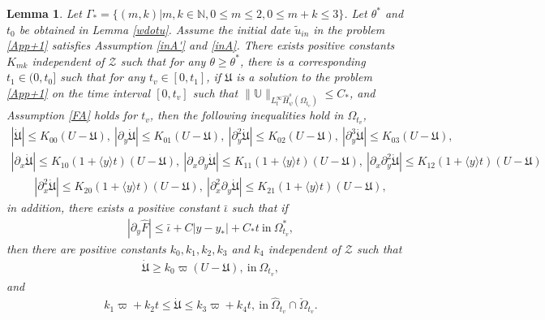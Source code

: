 \documentclass[10pt,a4paper]{amsart}
\newtheorem{lemma}{Lemma}
\newcommand\y{{{\langle y \rangle}}}
\begin{document}
\begin{lemma}\label{sdotu}
Let $\Gamma_{*}=\{(m,k)|m,k\in\mathbb{N}, 0\leq m\leq 2, 0\leq m+k\leq3\}$.
Let $\theta^{*}$ and $t_{0}$ be obtained in Lemma \ref{wdotu}.
Assume the initial date $\tilde{u}_{in}$ in the problem \eqref{App+1} satisfies Assumption \ref{inA'} and \ref{inA}.
There exists positive constants $K_{mk}$ independent of $\mathcal{Z}$ such that for any $\theta\geq\theta^{*}$, there is a corresponding $t_{1}\in(0,t_{0}]$ such that for any $t_{v}\in[0,t_{1}]$, if $\mathfrak{U}$ is a solution to the problem \eqref{App+1} on the time interval $[0,t_{v}]$ such that
$\|\mathbb{U}\|_{L_{t}^{\infty}\hat{H}_{\psi}^{s}(\Omega_{t_{v}})}\leq C_{*}$,
and Assumption \ref{FA} holds for $t_{v}$, then the following inequalities hold in $\Omega_{t_{v}}$,
\begin{align}\label{dotul}
|\dot{\mathfrak{U}}|\leq K_{00}(U-\mathfrak{U}),~
|\partial_{y}\dot{\mathfrak{U}}|\leq K_{01}(U-\mathfrak{U}),~
|\partial_{y}^{2}\dot{\mathfrak{U}}|\leq K_{02}(U-\mathfrak{U}),~
|\partial_{y}^{3}\dot{\mathfrak{U}}|\leq K_{03}(U-\mathfrak{U}),
\end{align}
\begin{align}\label{dotux1}
|\partial_{x}\dot{\mathfrak{U}}|\leq K_{10}(1+\y t)(U-\mathfrak{U}),~
|\partial_{x}\partial_{y}\dot{\mathfrak{U}}|\leq K_{11}(1+\y t)(U-\mathfrak{U}),~
|\partial_{x}\partial_{y}^{2}\dot{\mathfrak{U}}|\leq K_{12}(1+\y t)(U-\mathfrak{U})
\end{align}
\begin{align}\label{dotux2}
|\partial_{x}^{2}\dot{\mathfrak{U}}|\leq K_{20}(1+\y t)(U-\mathfrak{U}),~
|\partial_{x}^{2}\partial_{y}\dot{\mathfrak{U}}|\leq K_{21}(1+\y t)(U-\mathfrak{U}),
\end{align}
in addition, there exists a positive constant $\bar{\iota}$ such that if
\begin{align}\label{Fe}
|\partial_{y}\hat{F}|\leq \bar{\iota}+C|y-y_{*}|+C_{*}t~\text{in}~\Omega_{t_{v}}^{*},
\end{align}
then there are positive constants $k_{0},k_{1},k_{2},k_{3}$ and $k_{4}$ independent of $\mathcal{Z}$ such that
\begin{align}\label{dotug}
\dot{\mathfrak{U}}\geq k_{0}\varpi(U-\mathfrak{U}),~\text{in}~\Omega_{t_{v}},
\end{align}
and
\begin{align}\label{dotub}
k_{1}\varpi+k_{2}t\leq \dot{\mathfrak{U}}\leq k_{3}\varpi+k_{4}t,~\text{in}~\hat{\Omega}_{t_{v}}\cap\check{\Omega}_{t_{v}}.
\end{align}
\end{lemma}
\end{document}
